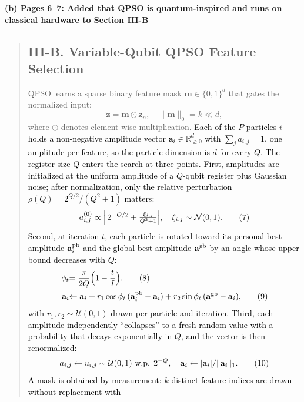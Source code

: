 \documentclass[11pt]{article}
\newenvironment{excerpt}{\begin{quote}\sloppy}{\end{quote}}
\newcommand{\mshead}[2]{\subsection*{\textbf{#1. #2}}}
\newcommand{\loc}[1]{\par\medskip\noindent\textbf{#1}\par}
\begin{document}
\loc{(b) Pages 6--7: Added that QPSO is quantum-inspired and runs on classical hardware to Section III-B}
\begin{excerpt}
\mshead{III-B}{Variable-Qubit QPSO Feature Selection}


QPSO learns a sparse binary feature mask
$\mathbf{m}\in\{0,1\}^d$ that gates the normalized input:
\begin{equation}
\tilde{\mathbf{z}} = \mathbf{m}\odot\mathbf{z}_n,\quad
\|\mathbf{m}\|_0 = k \ll d,
\tag{6}
\end{equation}
where $\odot$ denotes element-wise multiplication.
\textcolor{black}{Each of the $P$ particles $i$ holds a
non-negative amplitude vector $\mathbf{a}_i\in\mathbb{R}_{\ge 0}^{d}$
with $\sum_j a_{i,j}=1$, one amplitude per feature, so the particle
dimension is $d$ for every $Q$. The register size $Q$ enters the
search at three points. First, amplitudes are initialized at the
uniform amplitude of a $Q$-qubit register plus Gaussian noise; after
normalization, only the relative perturbation
$\rho(Q)=2^{Q/2}/(Q^{2}+1)$ matters:}
\begin{equation}
\textcolor{black}{a_{i,j}^{(0)} \propto \Bigl|\,2^{-Q/2} +
\tfrac{\xi_{i,j}}{Q^{2}+1}\Bigr|,\quad
\xi_{i,j}\sim\mathcal{N}(0,1).}
\tag{7}
\end{equation}
\textcolor{black}{Second, at iteration $t$, each particle is
rotated toward its personal-best amplitude $\mathbf{a}_i^{\rm pb}$
and the global-best amplitude $\mathbf{a}^{\rm gb}$ by an angle whose
upper bound decreases with $Q$:}
\begin{align}
\textcolor{black}{\phi_t} &\textcolor{black}{= \frac{\pi}{2Q}\Bigl(1-\frac{t}{I}\Bigr),}
\tag{8}\\
\textcolor{black}{\mathbf{a}_i} &\textcolor{black}{\leftarrow \mathbf{a}_i
+ r_1\cos\phi_t\,(\mathbf{a}_i^{\rm pb}-\mathbf{a}_i)
+ r_2\sin\phi_t\,(\mathbf{a}^{\rm gb}-\mathbf{a}_i),}
\tag{9}
\end{align}
\textcolor{black}{with $r_1,r_2\sim\mathcal{U}(0,1)$ drawn per
particle and iteration. Third, each amplitude independently
``collapses'' to a fresh random value with a probability that decays
exponentially in $Q$, and the vector is then renormalized:}
\begin{equation}
\textcolor{black}{a_{i,j} \leftarrow u_{i,j}\sim\mathcal{U}(0,1)
\ \text{w.p. } 2^{-Q},\quad
\mathbf{a}_i \leftarrow |\mathbf{a}_i| / \|\mathbf{a}_i\|_1 .}
\tag{10}
\end{equation}
\textcolor{black}{A mask is obtained by measurement: $k$
distinct feature indices are drawn without replacement with
}
\end{excerpt}
\end{document}
